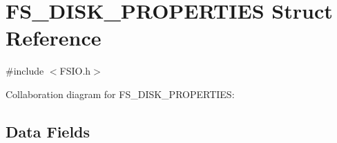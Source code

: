\hypertarget{struct_f_s___d_i_s_k___p_r_o_p_e_r_t_i_e_s}{}\section{F\+S\+\_\+\+D\+I\+S\+K\+\_\+\+P\+R\+O\+P\+E\+R\+T\+I\+E\+S Struct Reference}
\label{struct_f_s___d_i_s_k___p_r_o_p_e_r_t_i_e_s}


{\ttfamily \#include $<$F\+S\+I\+O.\+h$>$}



Collaboration diagram for F\+S\+\_\+\+D\+I\+S\+K\+\_\+\+P\+R\+O\+P\+E\+R\+T\+I\+E\+S\+:
\subsection*{Data Fields}
